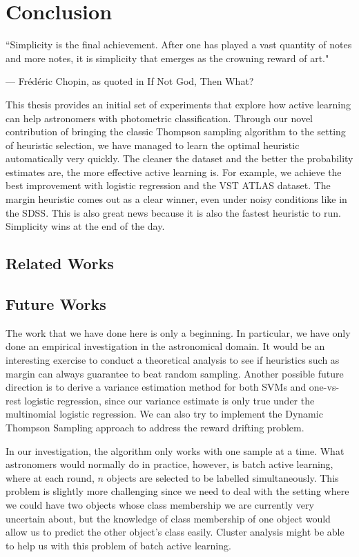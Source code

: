 
\chapter{Conclusion}
\label{cha:conclusion}


\epigraph{``Simplicity is the final achievement. After one has played a vast quantity of notes and more notes, it is simplicity that emerges as the crowning reward of art."}{--- \textup{Fr\'ed\'eric Chopin, as quoted in} If Not God, Then What?}


This thesis provides an initial set of experiments that explore how active learning can help astronomers with photometric classification. Through our novel contribution of bringing
the classic Thompson sampling algorithm to the setting of heuristic selection, we have managed to
learn the optimal heuristic automatically very quickly. The cleaner the dataset and 
the better the probability estimates are, the more effective active learning is. For example,
we achieve the best improvement with logistic regression and the VST ATLAS dataset. The margin
heuristic comes out as a clear winner, even under noisy conditions like in the SDSS. This
is also great news because it is also the fastest heuristic to run. Simplicity wins at the end of the day.

\section{Related Works}
\label{sec:related}



\section{Future Works}
\label{sec:future}

The work that we have done here is only a beginning. In particular, we have only done an empirical
investigation in the astronomical domain. It would be an interesting exercise to conduct a
theoretical analysis to see if heuristics such as margin can always guarantee to beat random sampling.
Another possible future direction is to derive a variance estimation method for both SVMs and
one-vs-rest logistic regression, since our variance estimate is only true under the multinomial logistic regression. We can also try to implement the Dynamic Thompson Sampling approach to address
the reward drifting problem.

In our investigation, the algorithm only works with one sample at a time. What astronomers would
normally do in practice, however, is batch active learning, where at each round, $n$ objects are selected to be labelled simultaneously. This problem is slightly more challenging since we need to deal with the setting where we could have two objects whose class membership we are currently very uncertain about, but the knowledge of class membership of one object would allow us to predict the other object's class easily. 
Cluster analysis might be able to help us with this problem of batch active learning.

